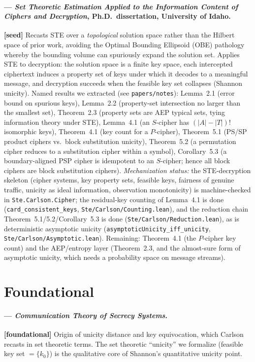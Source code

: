 \documentclass[11pt]{article}
\begin{document}
\paragraph{\citet{carlson2012} --- \emph{Set Theoretic Estimation
Applied to the Information Content of Ciphers and Decryption}, Ph.D.\
dissertation, University of Idaho.} \textbf{[seed]}
Recasts STE over a \emph{topological} solution space rather than the
Hilbert space of prior work, avoiding the Optimal Bounding Ellipsoid
(OBE) pathology whereby the bounding volume can spuriously expand the
solution set. Applies STE to decryption: the solution space is a finite
key space, each intercepted ciphertext induces a property set of keys
under which it decodes to a meaningful message, and decryption succeeds
when the feasible key set collapses (Shannon unicity). Named results we
extracted (see \texttt{papers/notes}): Lemma~2.1 (error bound on
spurious keys), Lemma~2.2 (property-set intersection no larger than the
smallest set), Theorem~2.3 (property sets are AEP typical sets, tying
information theory under STE), Lemma~4.1 (an $S$-cipher has
$(|A|-|T|)!$ isomorphic keys), Theorem~4.1 (key count for a $P$-cipher),
Theorem~5.1 (PS/SP product ciphers vs.\ block substitution unicity),
Theorem~5.2 (a permutation cipher reduces to a substitution cipher
within a symbol), Corollary~5.3 (a boundary-aligned PSP cipher is
idempotent to an $S$-cipher; hence all block ciphers are block
substitution ciphers). \emph{Mechanization status:} the STE-decryption
skeleton (cipher systems, key property sets, feasible keys, fairness of
genuine traffic, unicity as ideal information, observation monotonicity)
is machine-checked in \texttt{Ste.Carlson.Cipher}; the residual-key
counting of Lemma~4.1 is done
(\texttt{card\_consistent\_keys}, \texttt{Ste/Carlson/Counting.lean}),
and the reduction chain Theorem~5.1/5.2/Corollary~5.3 is done
(\texttt{Ste/Carlson/Reduction.lean}), as is deterministic asymptotic
unicity (\texttt{asymptoticUnicity\_iff\_unicity},
\texttt{Ste/Carlson/Asymptotic.lean}). Remaining: Theorem~4.1 (the
$P$-cipher key count) and the AEP/entropy layer (Theorem~2.3, and the
almost-sure form of asymptotic unicity, which needs a probability space
on message streams).

\section*{Foundational}

\paragraph{\citet{shannon1949} --- \emph{Communication Theory of Secrecy
Systems}.} \textbf{[foundational]}
Origin of unicity distance and key equivocation, which Carlson recasts
in set theoretic terms. The set theoretic ``unicity'' we formalize
(feasible key set $=\{k_0\}$) is the qualitative core of Shannon's
quantitative unicity point.
\end{document}
